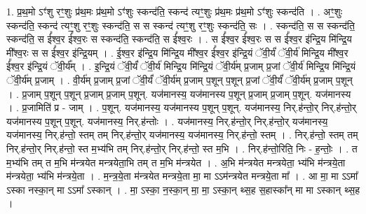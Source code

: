 \documentclass[17pt]{extarticle}
\begin{document}
1. प्र॒थ॒मो ऽꣳ॑शु रꣳ॒॒शुः प्र॑थ॒मः प्र॑थ॒मो ऽꣳ॑शुः स्कन्द॑ति॒ स्कन्द॑ त्यꣳ॒॒शुः प्र॑थ॒मः 
प्र॑थ॒मो ऽꣳ॑शुः स्कन्द॑ति । . अꣳ॒॒शुः स्कन्द॑ति॒ स्कन्द॑ त्यꣳ॒॒शु रꣳ॒॒शुः स्कन्द॑ति॒ स स स्कन्द॑ त्यꣳ॒॒शु रꣳ॒॒शुः स्कन्द॑ति॒ सः । . स्कन्द॑ति॒ स स स्कन्द॑ति॒ स्कन्द॑ति॒ स ई᳚श्व॒र ई᳚श्व॒रः स स्कन्द॑ति॒ स्कन्द॑ति॒ स ई᳚श्व॒रः । . स ई᳚श्व॒र ई᳚श्व॒रः स स ई᳚श्व॒र इ॑न्द्रि॒य मि॑न्द्रि॒य मी᳚श्व॒रः स स ई᳚श्व॒र इ॑न्द्रि॒यम् । . ई॒श्व॒र इ॑न्द्रि॒य मि॑न्द्रि॒य मी᳚श्व॒र ई᳚श्व॒र इ॑न्द्रि॒यं ॅवी॒र्यं॑ ॅवी॒र्य॑ मिन्द्रि॒य मी᳚श्व॒र ई᳚श्व॒र इ॑न्द्रि॒यं ॅवी॒र्य᳚म् । . इ॒न्द्रि॒यं ॅवी॒र्यं॑ ॅवी॒र्य॑ मिन्द्रि॒य मि॑न्द्रि॒यं ॅवी॒र्य॑म् प्र॒जाम् प्र॒जां ॅवी॒र्य॑ मिन्द्रि॒य मि॑न्द्रि॒यं ॅवी॒र्य॑म् प्र॒जाम् । . वी॒र्य॑म् प्र॒जाम् प्र॒जां ॅवी॒र्यं॑ ॅवी॒र्य॑म् प्र॒जाम् प॒शून् प॒शून् प्र॒जां ॅवी॒र्यं॑ ॅवी॒र्य॑म् प्र॒जाम् प॒शून् । . प्र॒जाम् प॒शून् प॒शून् प्र॒जाम् प्र॒जाम् प॒शून्. यज॑मानस्य॒ यज॑मानस्य प॒शून् प्र॒जाम् प्र॒जाम् प॒शून्. यज॑मानस्य । . प्र॒जामिति॑ प्र - जाम् । . प॒शून्. यज॑मानस्य॒ यज॑मानस्य प॒शून् प॒शून्. यज॑मानस्य॒ निर्.ह॑न्तो॒र् निर्.ह॑न्तो॒र् यज॑मानस्य प॒शून् प॒शून्. यज॑मानस्य॒ निर्.ह॑न्तोः । . यज॑मानस्य॒ निर्.ह॑न्तो॒र् निर्.ह॑न्तो॒र् यज॑मानस्य॒ यज॑मानस्य॒ निर्.ह॑न्तो॒ स्तम् तम् निर्.ह॑न्तो॒र् यज॑मानस्य॒ यज॑मानस्य॒ निर्.ह॑न्तो॒ स्तम् । . निर्.ह॑न्तो॒ स्तम् तम् निर्.ह॑न्तो॒र् निर्.ह॑न्तो॒ स्त म॒भ्य॑भि तम् निर्.ह॑न्तो॒र् निर्.ह॑न्तो॒ स्त म॒भि । . निर्.ह॑न्तो॒रिति॒ निः - ह॒न्तोः॒ । . त म॒भ्य॑भि तम् त म॒भि म॑न्त्रयेत मन्त्रयेता॒भि तम् त म॒भि म॑न्त्रयेत । . अ॒भि म॑न्त्रयेत मन्त्रयेता॒ भ्य॑भि म॑न्त्रये॒ता म॑न्त्रयेता॒ भ्य॑भि म॑न्त्रये॒ता । . म॒न्त्र॒ये॒ता म॑न्त्रयेत मन्त्रये॒ता मा॒ मा ऽऽम॑न्त्रयेत मन्त्रये॒ता मा᳚ । . आ मा॒ मा ऽऽमा᳚ ऽस्का नस्का॒न् मा ऽऽमा᳚ ऽस्कान् । . मा॒ ऽस्का॒ न॒स्का॒न् मा॒ मा॒ ऽस्का॒न् थ्स॒ह स॒हास्का᳚न् मा मा ऽस्कान् थ्स॒ह । \newline
\end{document}
